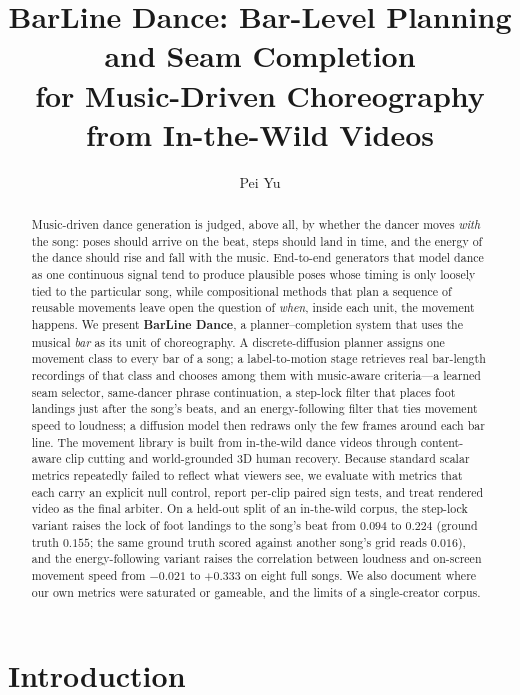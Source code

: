 \documentclass[10pt]{article}
\title{\textbf{BarLine Dance: Bar-Level Planning and Seam Completion\\for Music-Driven Choreography from In-the-Wild Videos}}
\author{Pei Yu}
\date{}
\begin{document}
\maketitle

\begin{abstract}
Music-driven dance generation is judged, above all, by whether the dancer moves \emph{with} the song: poses should arrive on the beat, steps should land in time, and the energy of the dance should rise and fall with the music.
End-to-end generators that model dance as one continuous signal tend to produce plausible poses whose timing is only loosely tied to the particular song, while compositional methods that plan a sequence of reusable movements leave open the question of \emph{when}, inside each unit, the movement happens.
We present \textbf{BarLine Dance}, a planner--completion system that uses the musical \emph{bar} as its unit of choreography.
A discrete-diffusion planner assigns one movement class to every bar of a song; a label-to-motion stage retrieves real bar-length recordings of that class and chooses among them with music-aware criteria---a learned seam selector, same-dancer phrase continuation, a step-lock filter that places foot landings just after the song's beats, and an energy-following filter that ties movement speed to loudness; a diffusion model then redraws only the few frames around each bar line.
The movement library is built from in-the-wild dance videos through content-aware clip cutting and world-grounded 3D human recovery.
Because standard scalar metrics repeatedly failed to reflect what viewers see, we evaluate with metrics that each carry an explicit null control, report per-clip paired sign tests, and treat rendered video as the final arbiter.
On a held-out split of an in-the-wild corpus, the step-lock variant raises the lock of foot landings to the song's beat from $0.094$ to $0.224$ (ground truth $0.155$; the same ground truth scored against another song's grid reads $0.016$), and the energy-following variant raises the correlation between loudness and on-screen movement speed from $-0.021$ to $+0.333$ on eight full songs.
We also document where our own metrics were saturated or gameable, and the limits of a single-creator corpus.
\end{abstract}

\section{Introduction}
\label{sec:intro}
\end{document}
